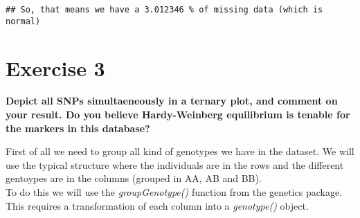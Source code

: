 \documentclass[]{article}
\begin{document}
\begin{verbatim}
## So, that means we have a 3.012346 % of missing data (which is normal)
\end{verbatim}

\section{Exercise 3}\label{exercise-3}

\textbf{Depict all SNPs simultaeneously in a ternary plot, and comment
on your result. Do you believe Hardy-Weinberg equilibrium is tenable for
the markers in this database?}

First of all we need to group all kind of genotypes we have in the
dataset. We will use the typical structure where the individuals are in
the rows and the different gentoypes are in the columns (grouped in AA,
AB and BB).\\
To do this we will use the \emph{groupGenotype()} function from the
genetics package. This requires a transformation of each column into a
\emph{genotype()} object.
\end{document}
